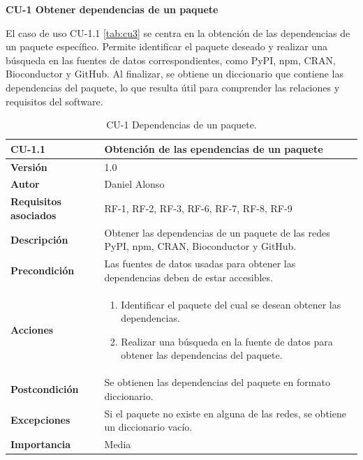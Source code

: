 \textbf{CU-1 Obtener dependencias de un paquete}

El caso de uso CU-1.1 \ref{tab:cu3} se centra en la obtención de las dependencias de un paquete específico. Permite 
identificar el paquete deseado y realizar una búsqueda en las fuentes de datos correspondientes, como PyPI, 
npm, CRAN, Bioconductor y GitHub. Al finalizar, se obtiene un diccionario que contiene las dependencias del 
paquete, lo que resulta útil para comprender las relaciones y requisitos del software.

\begin{table}[p]
	\centering
	\begin{tabularx}{\linewidth}{ p{} p{} }
		\toprule
		\textbf{CU-1.1}                 & \textbf{Obtención de las ependencias de un paquete}                              \\
		\toprule
		\textbf{Versión}              & 1.0                                                                              \\
		\textbf{Autor}                & Daniel Alonso                                                                    \\
		\textbf{Requisitos asociados} & RF-1, RF-2, RF-3, RF-6, RF-7, RF-8, RF-9                                         \\
		\textbf{Descripción}          & Obtener las dependencias de un paquete de las redes
		PyPI, npm, CRAN, Bioconductor y GitHub.                                                                          \\
		\textbf{Precondición}         & Las fuentes de datos usadas para obtener las dependencias
		deben de estar accesibles.                                                                                       \\
		\textbf{Acciones}             &
		\begin{enumerate}
			\def\labelenumi{\arabic{enumi}.}
			\tightlist
			\item Identificar el paquete del cual se desean obtener las dependencias.
			\item Realizar una búsqueda en la fuente de datos para obtener las dependencias del paquete.
		\end{enumerate}                      \\
		\textbf{Postcondición}        & Se obtienen las dependencias del paquete en formato diccionario.                 \\
		\textbf{Excepciones}          & Si el paquete no existe en alguna de las redes, se obtiene un diccionario vacío. \\
		\textbf{Importancia}          & Media                                                                            \\
		\bottomrule
	\end{tabularx}
	\caption{CU-1 Dependencias de un paquete.}
	\label{tab:cu1}
\end{table}



